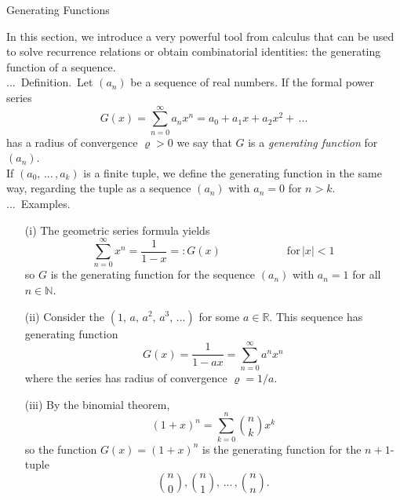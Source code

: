 \documentclass[smaller,hyperref={CJKbookmarks=true}]{beamer}
\newcommand{\N}{\mathbb{N}} \newcommand{\Z}{\mathbb{Z}} \newcommand{\Q}{\mathbb{Q}}
\newcommand{\R}{\mathbb{R}}
\newcounter{zhuo}[subsection]
\renewcommand{\thezhuo}{\thesection.\thesubsection.\arabic{zhuo}}
\newenvironment{DEFINITION}{\stepcounter{zhuo}\alert{\thezhuo.~Definition.\,}}{}
\newenvironment{EXAMPLES}{\stepcounter{zhuo}\alert{\!\thezhuo.~Examples.\,}}{}
\begin{document}
\begin{frame}{Generating Functions}
\begin{spacing}{1.05}
\vspace*{9pt}
In this section, we introduce a very powerful tool from calculus that can be
used to solve recurrence relations or obtain combinatorial identities: the
generating function of a sequence.\\[6pt]
\begin{DEFINITION}
Let $(a_n)$ be a sequence of real numbers. If the formal power series
\[G(x)=\sum_{n=0}^{\infty}a_nx^n=a_0+a_1x+a_2x^2+\,...\]
has a radius of convergence $\varrho>0$ we say that $G$ is a \emph{generating function} for $(a_n)$.\\[6pt]
If $(a_0,\,...\,,a_k)$ is a finite tuple, we define the generating function in the same way, regarding the tuple as a sequence $(a_n)$ with $a_n=0$ for $n>k$.
\end{DEFINITION}
\newpage
\begin{EXAMPLES}
\begin{itemize}
  \item[(i)] The geometric series formula yields
      \[\sum_{n=0}^{\infty}x^n=\frac{1}{1-x}=:G(x)\qquad\qquad\qquad
      \text{for}\,|x|<1\]
      so $G$ is the generating function for the sequence $(a_n)$ with $a_n=1$ for all $n\in\N$.
  \item[(ii)] Consider the $(1,\,a,\,a^2,\,a^3,\,...)$ for some $a\in\R$. This sequence has generating function
      \[G(x)=\frac{1}{1-ax}=\sum_{n=0}^{\infty}a^nx^n\]
      where the series has radius of convergence $\varrho=1/a$.
\newpage
\vspace*{11pt}
  \item[(iii)] By the binomial theorem,
      \[(1+x)^n=\sum_{k=0}^{n}\binom{n}{k}x^k\]
      so the function $G(x)=(1+x)^n$ is the generating function for the $n+1$-tuple
      \[\binom{n}{0},\binom{n}{1},\,...\,,\binom{n}{n}.\]
\end{itemize}
\end{EXAMPLES}
\end{spacing}
\end{frame}
\end{document}
